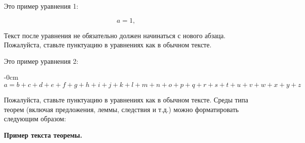 \documentclass[i-edu.uz,journal,article,submit,pdftex,moreauthors]{Definitions/i-edu.uz}
\begin{document}
\begin{sloppypar}
{Это пример уравнения 1:
\begin{linenomath}
\begin{equation}
a = 1,
\end{equation}
\end{linenomath}
Текст после уравнения не обязательно должен начинаться с нового абзаца. Пожалуйста, ставьте пунктуацию в уравнениях как в обычном тексте.

Это пример уравнения 2:
\begin{adjustwidth}{-\extralength}{0cm}
\begin{equation}
a = b + c + d + e + f + g + h + i + j + k + l + m + n + o + p + q + r + s + t + u + v + w + x + y + z
\end{equation}
\end{adjustwidth}



Пожалуйста, ставьте пунктуацию в уравнениях как в обычном тексте. Среды типа теорем (включая предложения, леммы, следствия и т.д.) можно форматировать следующим образом:
\begin{Theorem}
\textbf{Пример текста теоремы.}
\end{Theorem}

}
\end{sloppypar}
\end{document}
